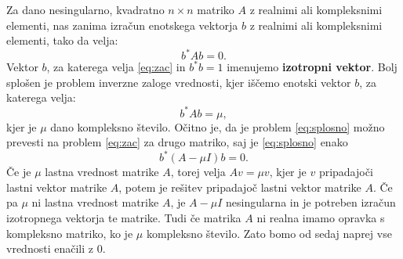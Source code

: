 \documentclass[12pt,a4paper]{amsart}
\theoremstyle{definition}
\theoremstyle{plain}
\begin{document}
Za dano nesingularno, kvadratno $n \times n$ matriko $A$ z realnimi ali kompleksnimi elementi, nas zanima izračun enotskega vektorja $b$ z realnimi ali kompleksnimi elementi, tako da velja:
\begin{equation}\label{eq:zac}
b^\ast Ab=0.
\end{equation}
Vektor $b$, za katerega velja \eqref{eq:zac} in $b^\ast b=1$  imenujemo \textbf{izotropni vektor}. 
Bolj splošen je problem inverzne zaloge vrednosti, kjer iščemo enotski vektor $b$, za katerega velja:
\begin{equation}\label{eq:splosno}
b^\ast Ab=\mu,
\end{equation}
kjer je $\mu$ dano kompleksno število. Očitno je, da je problem \eqref{eq:splosno} možno prevesti na problem \eqref{eq:zac} za drugo matriko, saj je \eqref{eq:splosno} enako
$$b^\ast (A-\mu I)b=0.$$
Če je $\mu$ lastna vrednost matrike $A$, torej velja $Av=\mu v$, kjer je $v$ pripadajoči lastni vektor matrike $A$, potem je rešitev pripadajoč lastni vektor matrike $A$. Če pa $\mu$ ni lastna vrednost matrike $A$, je $A-\mu I$ nesingularna in je potreben izračun izotropnega vektorja te matrike. Tudi če matrika $A$ ni realna imamo opravka s kompleksno matriko, ko je $\mu$ kompleksno število. Zato bomo od sedaj naprej vse vrednosti enačili z $0$.
\end{document}
